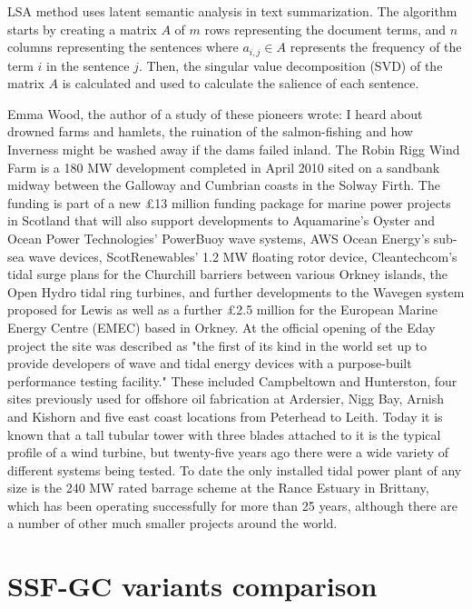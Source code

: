 LSA method \citep{04-steinberger-jezek} uses latent semantic analysis in text summarization. 
The algorithm starts by creating a matrix $ A $ of $ m $ rows representing the document terms, and 
$ n $ columns representing the sentences where $ a_{i, j} \in A $ represents the frequency of the term $ i $ in the sentence $ j $. 
Then, the singular value decomposition (SVD) of the matrix $ A $ is calculated and used to calculate the salience of each sentence.

\begin{tcolorbox}\footnotesize
	Emma Wood, the author of a study of these pioneers wrote: I heard about drowned farms and hamlets, the ruination of the salmon-fishing and how Inverness might be washed away if the dams failed inland.
	The Robin Rigg Wind Farm is a 180 MW development completed in April 2010 sited on a sandbank midway between the Galloway and Cumbrian coasts in the Solway Firth.
	The funding is part of a new £13 million funding package for marine power projects in Scotland that will also support developments to Aquamarine's Oyster and Ocean Power Technologies' PowerBuoy wave systems, AWS Ocean Energy's sub-sea wave devices, ScotRenewables' 1.2 MW floating rotor device, Cleantechcom's tidal surge plans for the Churchill barriers between various Orkney islands, the Open Hydro tidal ring turbines, and further developments to the Wavegen system proposed for Lewis as well as a further £2.5 million for the European Marine Energy Centre (EMEC) based in Orkney.
	At the official opening of the Eday project the site was described as "the first of its kind in the world set up to provide developers of wave and tidal energy devices with a purpose-built performance testing facility."
	These included Campbeltown and Hunterston, four sites previously used for offshore oil fabrication at Ardersier, Nigg Bay, Arnish and Kishorn and five east coast locations from Peterhead to Leith.
	Today it is known that a tall tubular tower with three blades attached to it is the typical profile of a wind turbine, but twenty-five years ago there were a wide variety of different systems being tested.
	To date the only installed tidal power plant of any size is the 240 MW rated barrage scheme at the Rance Estuary in Brittany, which has been operating successfully for more than 25 years, although there are a number of other much smaller projects around the world.
\end{tcolorbox}

\section{SSF-GC variants comparison}

